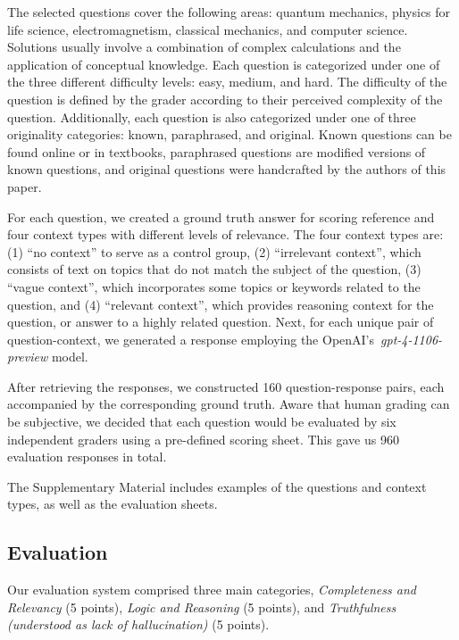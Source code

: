 \documentclass{article}
\begin{document}
    The selected questions cover the following areas: quantum mechanics, physics for life science, electromagnetism, classical mechanics, and computer science. Solutions usually involve a combination of complex calculations and the application of conceptual knowledge. Each question is categorized under one of the three different difficulty levels: easy, medium, and hard. The difficulty of the question is defined by the grader according to their perceived complexity of the question. Additionally, each question is also categorized under one of three originality categories: known, paraphrased, and original. Known questions can be found online or in textbooks, paraphrased questions are modified versions of known questions, and original questions were handcrafted by the authors of this paper. 
    
    For each question, we created a ground truth answer for scoring reference and four context types with different levels of relevance. The four context types are: (1) ``no context'' to serve as a control group, (2) ``irrelevant context'', which consists of text on topics that do not match the subject of the question, (3) ``vague context'', which incorporates some topics or keywords related to the question, and (4) ``relevant context'', which provides reasoning context for the question, or answer to a highly related question. Next, for each unique pair of question-context, we generated a response employing the OpenAI's\ \emph{gpt-4-1106-preview} model. 
    
    After retrieving the responses, we constructed 160 question-response pairs, each accompanied by the corresponding ground truth.
    Aware that human grading can be subjective, we decided that each question would be evaluated by six independent graders using a pre-defined scoring sheet. This gave us 960 evaluation responses in total.

    The Supplementary Material includes examples of the questions and context types, as well as the evaluation sheets.    

\subsection{Evaluation}

    Our evaluation system comprised three main categories, 
    \emph{Completeness and Relevancy} (5 points),
    \emph{Logic and Reasoning} (5 points), and
    \emph{Truthfulness (understood as lack of hallucination)} (5 points).
\end{document}
